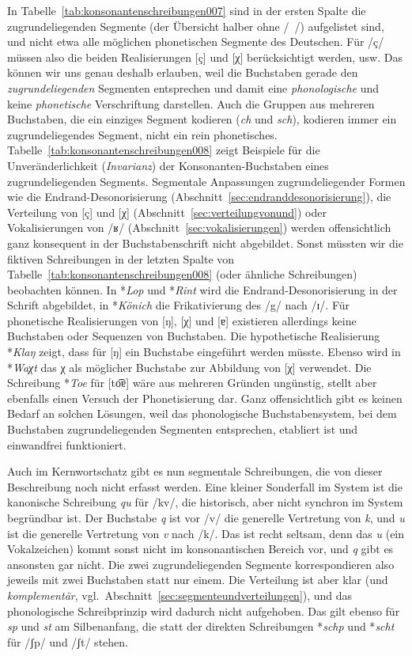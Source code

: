 In Tabelle~\ref{tab:konsonantenschreibungen007} sind in der ersten Spalte die zugrundeliegenden Segmente (der Übersicht halber ohne /~/) aufgelistet sind, und nicht etwa alle möglichen phonetischen Segmente des Deutschen.
Für /ç/ müssen also die beiden Realisierungen [ç] und [χ] berücksichtigt werden, usw.
Das können wir uns genau deshalb erlauben, weil die Buchstaben gerade den \textit{zugrundeliegenden} Segmenten entsprechen und damit eine \textit{phonologische} und keine \textit{phonetische} Verschriftung darstellen.
Auch die Gruppen aus mehreren Buchstaben, die ein einziges Segment kodieren (\zB \textit{ch} und \textit{sch}), kodieren immer ein zugrundeliegendes Segment, nicht ein rein phonetisches.
Tabelle~\ref{tab:konsonantenschreibungen008} zeigt Beispiele für die Unveränderlichkeit (\textit{Invarianz}) der Konsonanten-Buchstaben eines zugrundeliegenden Segments.
Segmentale Anpassungen zugrundeliegender Formen wie die Endrand-Desonorisierung (Abschnitt~\ref{sec:endranddesonorisierung}), die Verteilung von [ç] und [χ] (Abschnitt~\ref{sec:verteilungvonund}) oder Vokalisierungen von /ʁ/ (Abschnitt~\ref{sec:vokalisierungen}) werden offensichtlich ganz konsequent in der Buchstabenschrift nicht abgebildet.
Sonst müssten wir die fiktiven Schreibungen in der letzten Spalte von Tabelle~\ref{tab:konsonantenschreibungen008} (oder ähnliche Schreibungen) beobachten können.
In *\textit{Lop} und *\textit{Rint} wird die Endrand-Desonorisierung in der Schrift abgebildet, in *\textit{Könich} die Frikativierung des /g/ nach /ɪ/.
Für phonetische Realisierungen von [ŋ], [χ] und [ɐ] existieren allerdings keine Buchstaben oder Sequenzen von Buchstaben.
Die hypothetische Realisierung *\textit{Klaŋ} zeigt, dass für [ŋ] ein Buchstabe eingeführt werden müsste.
Ebenso wird in *\textit{Waχt} das χ als möglicher Buchstabe zur Abbildung von [χ] verwendet.
Die Schreibung *\textit{Toe} für [to͡ɐ] wäre aus mehreren Gründen ungünstig, stellt aber ebenfalls einen Versuch der Phonetisierung dar.
Ganz offensichtlich gibt es keinen Bedarf an solchen Lösungen, weil das phonologische Buchstabensystem, bei dem Buchstaben zugrundeliegenden Segmenten entsprechen, etabliert ist und einwandfrei funktioniert.

Auch im Kernwortschatz gibt es nun segmentale Schreibungen, die von dieser Beschreibung noch nicht erfasst werden.
Eine kleiner Sonderfall im System ist die kanonische Schreibung \textit{qu} für /kv/, die historisch, aber nicht synchron im System begründbar ist.
Der Buchstabe \textit{q} ist vor /v/ die generelle Vertretung von \textit{k}, und \textit{u} ist die generelle Vertretung von \textit{v} nach /k/.
Das ist recht seltsam, denn das \textit{u} (ein Vokalzeichen) kommt sonst nicht im konsonantischen Bereich vor, und \textit{q} gibt es ansonsten gar nicht.
Die zwei zugrundeliegenden Segmente korrespondieren also jeweils mit zwei Buchstaben statt nur einem.
Die Verteilung ist aber klar (und \textit{komplementär}, vgl.\ Abschnitt~\ref{sec:segmenteundverteilungen}), und das phonologische Schreibprinzip wird dadurch nicht aufgehoben.
Das gilt ebenso für \textit{sp} und \textit{st} am Silbenanfang, die statt der direkten Schreibungen *\textit{schp} und *\textit{scht} für /ʃp/ und /ʃt/ stehen.

